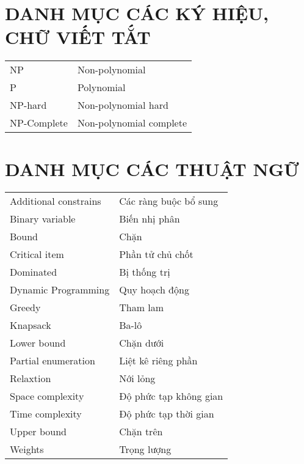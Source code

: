 \chapter*{DANH MỤC CÁC KÝ HIỆU, CHỮ VIẾT TẮT}
\begin{center}
	\begin{longtable}{ l  l }
        NP & Non-polynomial\\ 
        P &  Polynomial\\
        NP-hard & Non-polynomial hard\\
        NP-Complete & Non-polynomial complete\\
\end{longtable}
\end{center}

\chapter*{DANH MỤC CÁC THUẬT NGỮ}
\begin{center}
	\begin{longtable}{ l  l }
        Additional constrains & Các ràng buộc bổ sung\\ 
        Binary variable & Biến nhị phân \\
        Bound & Chặn\\
        Critical item & Phần tử chủ chốt\\
        Dominated & Bị thống trị\\
        Dynamic Programming & Quy hoạch động\\
        Greedy & Tham lam\\
        Knapsack & Ba-lô\\
        Lower bound & Chặn dưới\\
        Partial enumeration & Liệt kê riêng phần\\
        Relaxtion & Nới lỏng\\
        Space complexity & Độ phức tạp không gian\\
        Time complexity & Độ phức tạp thời gian\\
        Upper bound & Chặn trên\\
        Weights & Trọng lượng\\
\end{longtable}
\end{center}